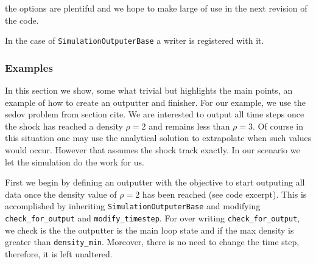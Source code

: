 the options are plentiful and we hope to make large of use in the next
revision of the code.

In the case of \lstinline{SimulationOutputerBase} a writer is registered with it.

\subsubsection{Examples}
In this section we show, some what trivial but highlights the main points, an example of
how to create an outputter and finisher. For our example, we use the sedov problem from 
section cite. We are interested to output all time steps once the shock has reached
a density $\rho=2$ and remains less than $\rho=3$. Of course in this situation one may
use the analytical solution to extrapolate when such values would occur. However that
assumes the shock track exactly. In our scenario we let the simulation do the work
for us.

First we begin by defining an outputter with the objective to start outputing
all data once the density value of $\rho=2$ has been reached (see code excerpt). This
is accomplished by inheriting \lstinline{SimulationOutputerBase} and modifying
\lstinline{check_for_output} and \lstinline{modify_timestep}. For over writing
\lstinline{check_for_output}, we check is the the outputter is the main loop state
and if the max density is greater than \lstinline{density_min}. Moreover, there
is no need to change the time step, therefore, it is left unaltered.


